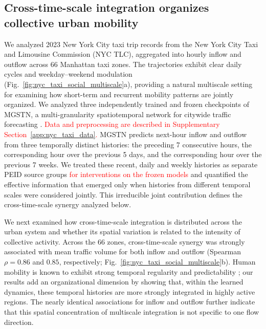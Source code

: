 \documentclass[fleqn,10pt]{wlscirep}
\newcommand{\rev}[1]{\textcolor{red}{#1}}
\theoremstyle{naturetheorem}
\begin{document}
\subsection*{Cross-time-scale integration organizes collective urban mobility}

We analyzed 2023 New York City taxi trip records from the New York City Taxi and Limousine Commission (NYC TLC), aggregated into hourly inflow and outflow across 66 Manhattan taxi zones. The trajectories exhibit clear daily cycles and weekday--weekend modulation (Fig.~\ref{fig:nyc_taxi_social_multiscale}a), providing a natural multiscale setting for examining how short-term and recurrent mobility patterns are jointly organized. %
We analyzed three independently trained and frozen checkpoints of MGSTN, a multi-granularity spatiotemporal network for citywide traffic forecasting \cite{Shi2026MGSTN}. \rev{Data and preprocessing are described in Supplementary Section~\ref{app:nyc_taxi_data}.} MGSTN predicts next-hour inflow and outflow from three temporally distinct histories: the preceding 7 consecutive hours, the corresponding hour over the previous 5 days, and the corresponding hour over the previous 7 weeks. We treated these recent, daily and weekly histories as separate PEID source groups \rev{ for interventions on the frozen models} and quantified the effective information that emerged only when histories from different temporal scales were considered jointly. This irreducible joint contribution defines the cross-time-scale synergy analyzed below.

We next examined how cross-time-scale integration is distributed across the urban system and whether its spatial variation is related to the intensity of collective activity. Across the 66 zones, cross-time-scale synergy was strongly associated with mean traffic volume for both inflow and outflow (Spearman $\rho=0.86$ and $0.85$, respectively; Fig.~\ref{fig:nyc_taxi_social_multiscale}b). Human mobility is known to exhibit strong temporal regularity and predictability \cite{Gonzalez2008HumanMobility,Song2010Predictability}; our results add an organizational dimension by showing that, within the learned dynamics, these temporal histories are more strongly integrated in highly active regions. The nearly identical associations for inflow and outflow further indicate that this spatial concentration of multiscale integration is not specific to one flow direction.
\end{document}
